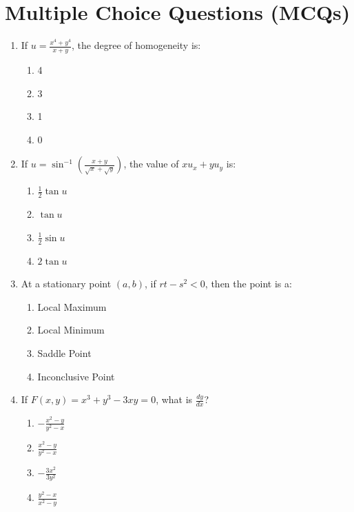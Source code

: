 \section{Multiple Choice Questions (MCQs)}

\begin{enumerate}[leftmargin=1.5em]
    \item If $u = \frac{x^4+y^4}{x+y}$, the degree of homogeneity is:
    \begin{enumerate}[label=(\alph*)]
        \item 4
        \item 3
        \item 1
        \item 0
    \end{enumerate}

    \item If $u = \sin^{-1}\left(\frac{x+y}{\sqrt{x}+\sqrt{y}}\right)$, the value of $x u_x + y u_y$ is:
    \begin{enumerate}[label=(\alph*)]
        \item $\frac{1}{2}\tan u$
        \item $\tan u$
        \item $\frac{1}{2}\sin u$
        \item $2\tan u$
    \end{enumerate}

    \item At a stationary point $(a,b)$, if $rt - s^2 < 0$, then the point is a:
    \begin{enumerate}[label=(\alph*)]
        \item Local Maximum
        \item Local Minimum
        \item Saddle Point
        \item Inconclusive Point
    \end{enumerate}

    \item If $F(x,y) = x^3 + y^3 - 3xy = 0$, what is $\frac{dy}{dx}$?
    \begin{enumerate}[label=(\alph*)]
        \item $-\frac{x^2 - y}{y^2 - x}$
        \item $\frac{x^2 - y}{y^2 - x}$
        \item $-\frac{3x^2}{3y^2}$
        \item $\frac{y^2-x}{x^2-y}$
    \end{enumerate}


\end{enumerate}
